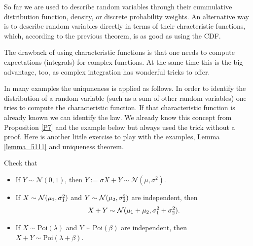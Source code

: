 \begin{lwarnhinweis}
So far we are used to describe random variables through their cummulative distribution function, density, or discrete probability weights. An alternative way is to describe random variables directly in terms of their chracteristic functions, which, according to the previous theorem, is as good as using the CDF.
\end{lwarnhinweis}
The drawback of using characteristic functions is that one needs to compute expectations (integrals) for complex functions. At the same time this is the big advantage, too, as complex integration has wonderful tricks to offer. \smallskip

In many examples the uniquneness is applied as follows. In order to identify the distribution of a random variable (such as a sum of other random variables) one tries to compute the characteristic function. If that characteristic function is already known we can identify the law. We already know this concept from Proposition \ref{P7} and the example below but always used the trick without a proof. Here is another little exercise to play with the examples, Lemma \ref{lemma_5111} and uniqueness theorem.
\begin{luebung}
	Check that 
	\begin{itemize}
		\item If $Y\sim \mathcal N(0,1)$, then $Y:=\sigma X+Y\sim \mathcal N(\mu,\sigma^2)$.
		\item
		If $X \sim \mathcal{N}(\mu_1,\sigma_1^2)$ and $Y \sim \mathcal{N}(\mu_2,\sigma_2^2)$ are independent, then $$X+Y \sim \mathcal{N}(\mu_1+\mu_2, \sigma_1^2 + \sigma_2^2).$$
	\item
		If $X \sim \text{Poi}(\lambda)$ and $Y \sim \text{Poi}(\beta)$ are independent, then $X + Y \sim \text{Poi}(\lambda + \beta)$. 
	\end{itemize}
\end{luebung}



